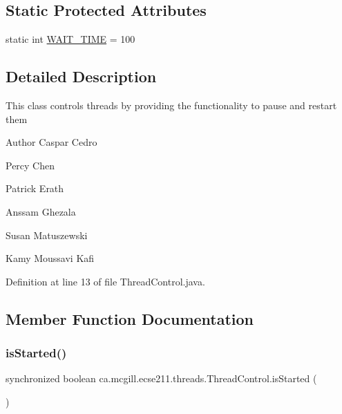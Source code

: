 \subsection*{Static Protected Attributes}
\begin{DoxyCompactItemize}
\item 
static int \hyperlink{classca_1_1mcgill_1_1ecse211_1_1threads_1_1_thread_control_a395cfe1d73b3ef14da0830ed0a499f82}{W\+A\+I\+T\+\_\+\+T\+I\+ME} = 100
\end{DoxyCompactItemize}


\subsection{Detailed Description}
This class controls threads by providing the functionality to pause and restart them

\begin{DoxyAuthor}{Author}
Caspar Cedro 

Percy Chen 

Patrick Erath 

Anssam Ghezala 

Susan Matuszewski 

Kamy Moussavi Kafi 
\end{DoxyAuthor}


Definition at line 13 of file Thread\+Control.\+java.



\subsection{Member Function Documentation}
\mbox{\label{classca_1_1mcgill_1_1ecse211_1_1threads_1_1_thread_control_a92f4933511db42476e39956246bcf2fe}} 
\subsubsection{\texorpdfstring{is\+Started()}{isStarted()}}
{\footnotesize\ttfamily synchronized boolean ca.\+mcgill.\+ecse211.\+threads.\+Thread\+Control.\+is\+Started (\begin{DoxyParamCaption}{ }\end{DoxyParamCaption})}

